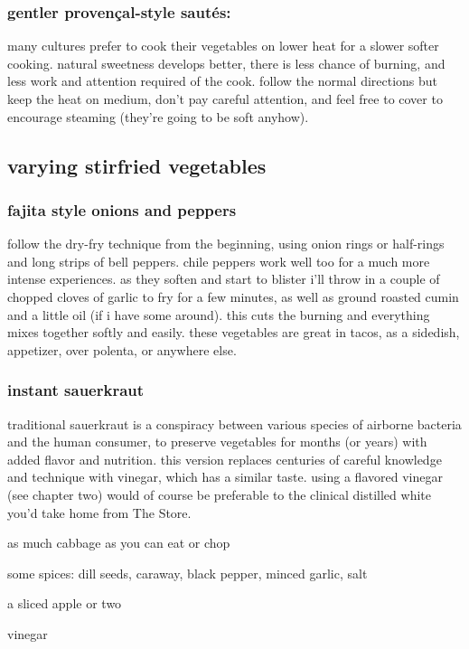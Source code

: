\subsubsection{gentler proven\c{c}al-style saut\'{e}s:}

many cultures prefer to cook their vegetables on lower heat for a slower 
softer cooking. natural sweetness develops better, there is less chance of 
burning, and less work and attention required of the cook. follow the normal 
directions but keep the heat on medium, don't pay careful attention, and feel 
free to cover to encourage steaming (they're going to be soft anyhow).

\subsection{varying stirfried vegetables}

\subsubsection{fajita style onions and peppers}

follow the dry-fry technique from the beginning, using onion rings or 
half-rings and long strips of bell peppers. chile peppers work well too for a 
much more intense experiences. as they soften and start to blister i'll throw 
in a couple of chopped cloves of garlic to fry for a few minutes, as well as 
ground roasted cumin and a little oil (if i have some around). this cuts the 
burning and everything mixes together softly and easily. these vegetables are 
great in tacos, as a sidedish, appetizer, over polenta, or anywhere else.

\subsubsection{instant sauerkraut}

traditional sauerkraut is a conspiracy between various species of airborne 
bacteria and the human consumer, to preserve vegetables for months (or years) 
with added flavor and nutrition. this version replaces centuries of careful 
knowledge and technique with vinegar, which has a similar taste. using a 
flavored vinegar (see chapter two) would of course be preferable to the 
clinical distilled white you'd take home from The Store.

\begin{ingredients}
  \item as much cabbage as you can eat or chop
  \item some spices: dill seeds, caraway, black pepper, minced garlic, salt
  \item a sliced apple or two
  \item vinegar
\end{ingredients}

